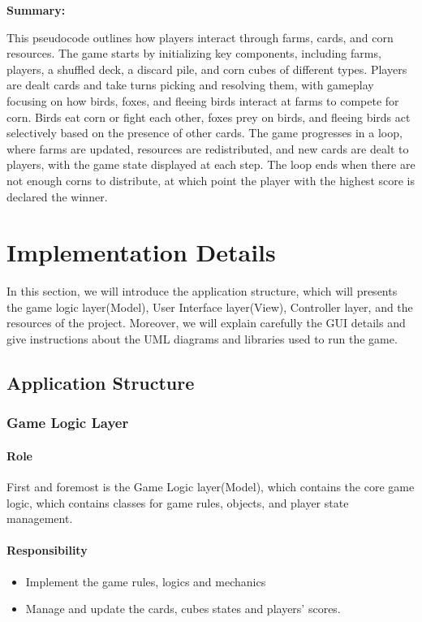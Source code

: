 \documentclass[conference]{IEEEtran}
\begin{document}
\vspace{0.2cm}

\textbf{Summary:}

This pseudocode outlines how players interact through farms, cards, and corn resources. The game starts by initializing key components, including farms, players, a shuffled deck, a discard pile, and corn cubes of different types. Players are dealt cards and take turns picking and resolving them, with gameplay focusing on how birds, foxes, and fleeing birds interact at farms to compete for corn. Birds eat corn or fight each other, foxes prey on birds, and fleeing birds act selectively based on the presence of other cards. The game progresses in a loop, where farms are updated, resources are redistributed, and new cards are dealt to players, with the game state displayed at each step. The loop ends when there are not enough corns to distribute, at which point the player with the highest score is declared the winner.

\section{Implementation Details}

In this section, we will introduce the application structure, which will presents the game logic layer(Model), User Interface layer(View), Controller layer, and the resources of the project. Moreover, we will explain carefully the GUI details and give instructions about the UML diagrams and libraries used to run the game. 
\subsection{Application Structure}
\subsubsection{Game Logic Layer}
\paragraph{Role}
First and foremost is the Game Logic layer(Model), which contains the core game logic, which contains classes for game rules, objects, and player state management.

\paragraph{Responsibility}
\begin{itemize}
    \item Implement the game rules, logics and mechanics
    \item Manage and update the cards, cubes states and players' scores.
\end{itemize}
\end{document}
